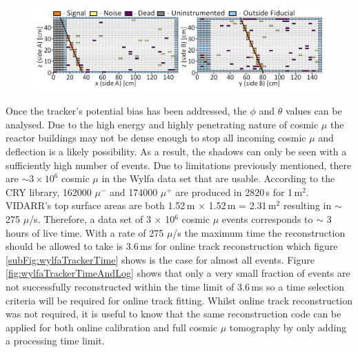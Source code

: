 \begin{figure}[!h]
 \centering
 \includegraphics[width=\linewidth]{Chapter6/Figs/Raster/newExampleEventWylfaMedText.png}
 \label{fig:3000ExampleEventWithKey}
\end{figure}

Once the tracker's potential bias has been addressed, the $\phi$ and $\theta$ values can be analysed. Due to the high energy and highly penetrating nature of cosmic $\mu$ \cite{Olive_2014,} the reactor buildings may not be dense enough to stop all incoming cosmic $\mu$ and deflection is a likely possibility. As a result, the shadows can only be seen with a sufficiently high number of events. Due to limitations previously mentioned, there are $\sim 3 \times 10^6$ cosmic $\mu$ in the Wylfa data set that are usable. According to the CRY library, \cite{ieee_cry_2007} 162000 $\mu^-$ and 174000 $\mu^+$ are produced in 2820\,s for 1\,m$^2$. VIDARR's top surface areas are both 1.52\,m $\times$ 1.52\,m = 2.31\,m$^2$ resulting in $\sim$ 275 $\mu$/s. Therefore, a data set of 3 $\times$ 10$^6$ cosmic $\mu$ events corresponds to $\sim$ 3 hours of live time. With a rate of 275 $\mu$/s the maximum time the reconstruction should be allowed to take is 3.6\,ms for online track reconstruction which figure \ref{subFig:wylfaTrackerTime} shows is the case for almost all events. Figure \ref{fig:wylfaTrackerTimeAndLog} shows that only a very small fraction of events are not successfully reconstructed within the time limit of 3.6\,ms so a time selection criteria will be required for online track fitting. Whilst online track reconstruction was not required, it is useful to know that the same reconstruction code can be applied for both online calibration and full cosmic $\mu$ tomography by only adding a processing time limit. 


